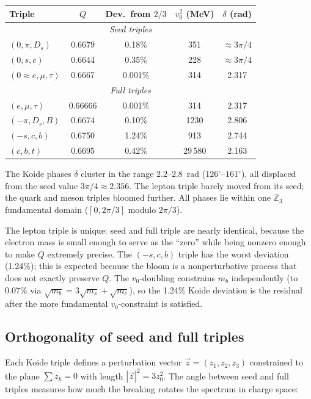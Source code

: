 \documentclass[12pt,a4paper]{article}
\begin{document}
\begin{center}
\begin{tabular}{lcccc}
\toprule
Triple & $Q$ & Dev.\ from $2/3$ & $v_0^2$ (MeV) & $\delta$ (rad) \\
\midrule
\multicolumn{5}{c}{\textit{Seed triples}} \\
$(0, \pi, D_s)$ & 0.6679 & 0.18\% & 351 & $\approx 3\pi/4$ \\
$(0, s, c)$ & 0.6644 & 0.35\% & 228 & $\approx 3\pi/4$ \\
$(0 \approx e, \mu, \tau)$ & 0.6667 & 0.001\% & 314 & 2.317 \\
\midrule
\multicolumn{5}{c}{\textit{Full triples}} \\
$(e, \mu, \tau)$ & 0.66666 & 0.001\% & 314 & 2.317 \\
$(-\pi, D_s, B)$ & 0.6674 & 0.10\% & 1230 & 2.806 \\
$(-s, c, b)$ & 0.6750 & 1.24\% & 913 & 2.744 \\
$(c, b, t)$ & 0.6695 & 0.42\% & 29\,580 & 2.163 \\
\bottomrule
\end{tabular}
\end{center}

The Koide phases $\delta$ cluster in the range $2.2$--$2.8$~rad
($126^\circ$--$161^\circ$), all displaced from the seed value
$3\pi/4 \approx 2.356$. The lepton triple barely moved from its
seed; the quark and meson triples bloomed further. All phases
lie within one $\mathbb{Z}_3$ fundamental domain ($[0, 2\pi/3]$
modulo $2\pi/3$).

The lepton triple is unique: seed and full triple are nearly
identical, because the electron mass is small enough to serve as
the ``zero'' while being nonzero enough to make $Q$ extremely
precise. The $(-s,c,b)$ triple has the worst deviation (1.24\%);
this is expected because the bloom is a nonperturbative process
that does not exactly preserve $Q$. The $v_0$-doubling constrains
$m_b$ independently (to 0.07\% via $\sqrt{m_b} = 3\sqrt{m_s} +
\sqrt{m_c}$), so the 1.24\% Koide deviation is the residual after
the more fundamental $v_0$-constraint is satisfied.

\subsection{Orthogonality of seed and full triples}

Each Koide triple defines a perturbation vector
$\vec{z} = (z_1, z_2, z_3)$ constrained to the plane $\sum z_k = 0$
with length $|\vec{z}|^2 = 3z_0^2$. The angle between seed and
full triples measures how much the breaking rotates the spectrum
in charge space:
\end{document}
